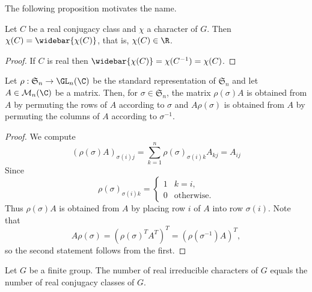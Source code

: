 The following proposition motivates the name.
\begin{proposition}
Let $C$ be a real conjugacy class and $\chi$ a character of $G$. Then
$\chi(C)=\widebar{\chi(C)}$, that is, $\chi(C)\in\R$.
\end{proposition}
\begin{proof}
If $C$ is real then $\widebar{\chi(C)}=\chi(C^{-1})=\chi(C)$.
\end{proof}
\begin{lemma}\label{representation S_n standard lem}
Let $\rho:\mathfrak{S}_n\to\GL_n(\C)$ be the standard representation of $\mathfrak{S}_n$ and let $A\in\mathcal{M}_n(\C)$ be a matrix. Then, for $\sigma\in\mathfrak{S}_n$, the matrix $\rho(\sigma)A$ is obtained from $A$ by permuting the rows of $A$ according to $\sigma$ and $A\rho(\sigma)$ is obtained from $A$ by permuting the columns of $A$ according to $\sigma^{-1}$.
\end{lemma}
\begin{proof}
We compute 
\[(\rho(\sigma)A)_{\sigma(i)j}=\sum_{k=1}^{n}\rho(\sigma)_{\sigma(i)k}A_{kj}=A_{ij}\]
Since
\[\rho(\sigma)_{\sigma(i)k}=\begin{cases}
1&k=i,\\
0&\text{otherwise}.
\end{cases}\]
Thus $\rho(\sigma)A$ is obtained from $A$ by placing row $i$ of $A$ into row $\sigma(i)$. Note that
\[A\rho(\sigma)=(\rho(\sigma)^TA^T)^T=(\rho(\sigma^{-1})A)^T,\] 
so the second statement follows from the first.
\end{proof}
\begin{theorem}\label{Burnside real conjugate}
Let $G$ be a finite group. The number of real irreducible characters of $G$ equals the number of real conjugacy classes of $G$.
\end{theorem}
